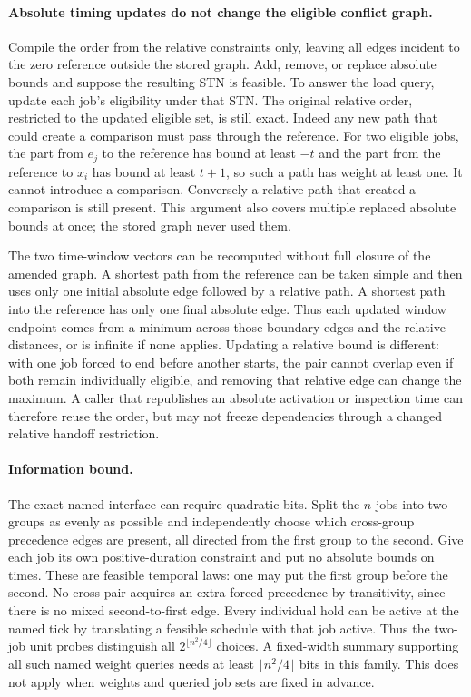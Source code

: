 \documentclass[11pt]{article}
\begin{document}
\paragraph{Absolute timing updates do not change the eligible conflict graph.}
Compile the order from the relative constraints only, leaving all edges incident to the zero reference outside the stored graph. Add, remove, or replace absolute bounds and suppose the resulting STN is feasible. To answer the load query, update each job's eligibility under that STN. The original relative order, restricted to the updated eligible set, is still exact. Indeed any new path that could create a comparison must pass through the reference. For two eligible jobs, the part from $e_j$ to the reference has bound at least $-t$ and the part from the reference to $x_i$ has bound at least $t+1$, so such a path has weight at least one. It cannot introduce a comparison. Conversely a relative path that created a comparison is still present. This argument also covers multiple replaced absolute bounds at once; the stored graph never used them.

The two time-window vectors can be recomputed without full closure of the amended graph. A shortest path from the reference can be taken simple and then uses only one initial absolute edge followed by a relative path. A shortest path into the reference has only one final absolute edge. Thus each updated window endpoint comes from a minimum across those boundary edges and the relative distances, or is infinite if none applies. Updating a relative bound is different: with one job forced to end before another starts, the pair cannot overlap even if both remain individually eligible, and removing that relative edge can change the maximum. A caller that republishes an absolute activation or inspection time can therefore reuse the order, but may not freeze dependencies through a changed relative handoff restriction.

\paragraph{Information bound.}
The exact named interface can require quadratic bits. Split the $n$ jobs into two groups as evenly as possible and independently choose which cross-group precedence edges are present, all directed from the first group to the second. Give each job its own positive-duration constraint and put no absolute bounds on times. These are feasible temporal laws: one may put the first group before the second. No cross pair acquires an extra forced precedence by transitivity, since there is no mixed second-to-first edge. Every individual hold can be active at the named tick by translating a feasible schedule with that job active. Thus the two-job unit probes distinguish all $2^{\lfloor n^2/4\rfloor}$ choices. A fixed-width summary supporting all such named weight queries needs at least $\lfloor n^2/4\rfloor$ bits in this family. This does not apply when weights and queried job sets are fixed in advance.
\end{document}
